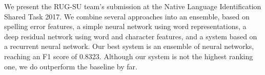 We present the RUG-SU team's submission at the Native Language Identification Shared Task 2017. We combine several approaches into an ensemble, based on spelling error features, a simple neural network using word representations, a deep residual network using word and character features, and a system based on a recurrent neural network. Our best system is an ensemble of neural networks, reaching an F1 score of 0.8323. Although our system is not the highest ranking one, we do outperform the baseline by far.
